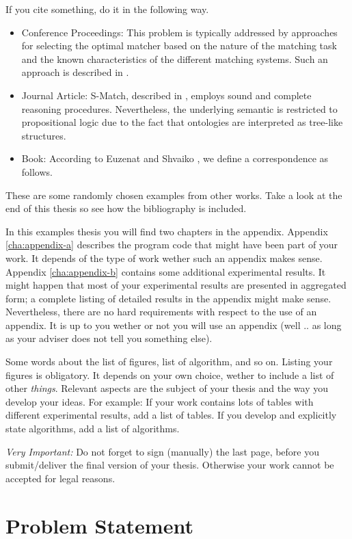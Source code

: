 If you cite something, do it in the following way. 
\begin{itemize}
	\item Conference Proceedings: This problem is typically addressed by approaches for selecting the optimal matcher based on the nature of the matching task and the known characteristics of the different matching systems. Such an approach is described in \cite{mochol08matcher}.
	\item Journal Article: S-Match, described in \cite{giunchiglia2008semanticmatching}, employs sound and complete reasoning procedures. Nevertheless, the underlying semantic is restricted to propositional logic due to the fact that ontologies are interpreted as tree-like structures.
	\item Book: According to Euzenat and Shvaiko \cite{euzenat07matcherbook}, we define a correspondence as follows.
\end{itemize}
These are some randomly chosen examples from other works. Take a look at the end of this thesis so see how the bibliography is included.

In this examples thesis you will find two chapters in the appendix. Appendix \ref{cha:appendix-a} describes the program code that might have been part of your work. It depends of the type of work wether such an appendix makes sense. Appendix \ref{cha:appendix-b} contains some additional experimental results. It might happen that most of your experimental results are presented in aggregated form; a complete listing of detailed results in the appendix might make sense. Nevertheless, there are no hard requirements with respect to the use of an appendix. It is up to you wether or not you will use an appendix (well .. as long as your adviser does not tell you something else).

Some words about the list of figures, list of algorithm, and so on. Listing your figures is obligatory. It depends on your own choice, wether to include a list of other \textit{things}. Relevant aspects are the subject of your thesis and the way you develop your ideas. For example: If your work contains lots of tables with different experimental results, add a list of tables. If you develop and explicitly state algorithms, add a list of algorithms. 

\emph{Very Important:} Do not forget to sign (manually) the last page, before you submit/deliver the final version of your thesis. Otherwise your work cannot be accepted for legal reasons.
 
\section{Problem Statement}
 
